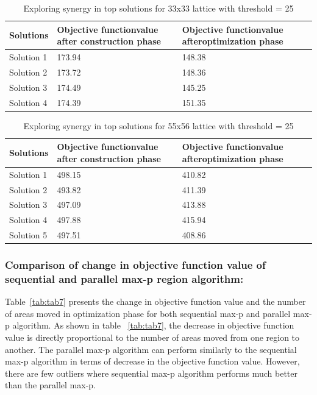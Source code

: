 \documentclass[conference]{IEEEtran}
\begin{document}
\begin{table}[!htbp] 
\begin{center}
\begin{tabular}{|C{1.4cm}|C{1.4cm}|C{1.4cm}|}
\hline
Solutions & Objective function\newline value after \newline construction phase & Objective function\newline value after\newline optimization phase\\
\hline
Solution 1 & 173.94 & 148.38\\
\hline
Solution 2 & 173.72 & 148.36\\
\hline
Solution 3 & 174.49 & 145.25\\
\hline
Solution 4 & 174.39 & 151.35\\
\hline
\end{tabular}
\caption{Exploring synergy in top solutions for 33x33 lattice with threshold = 25}
\label{tab:tab9}
\end{center}
\end{table}

\begin{table}[!htbp]
\begin{center}
\begin{tabular}{|C{1.4cm}|C{1.4cm}|C{1.4cm}|}
\hline
Solutions & Objective function\newline value after \newline construction phase & Objective function\newline value after\newline optimization phase\\
\hline
Solution 1 & 498.15 & 410.82\\
\hline
Solution 2 & 493.82 & 411.39\\
\hline
Solution 3 & 497.09 & 413.88\\
\hline
Solution 4 & 497.88 & 415.94\\
\hline
Solution 5 & 497.51 & 408.86\\
\hline
\end{tabular}
\caption{Exploring synergy in top solutions for 55x56 lattice with threshold = 25}
\label{tab:tab10}
\end{center}
\end{table}

\subsubsection*{Comparison of change in objective function value of sequential and parallel max-p region algorithm:}
Table~\ref{tab:tab7} presents the change in objective function value and the number
of areas moved in optimization phase for both sequential max-p and parallel
max-p algorithm. As shown in table ~\ref{tab:tab7}, the decrease in objective
function value is directly proportional to the number of areas moved from one
region to another. The parallel max-p algorithm can perform similarly to
the sequential max-p algorithm in terms of decrease in the objective function
value. However, there are few outliers where sequential max-p algorithm performs
much better than the parallel max-p.
\end{document}
